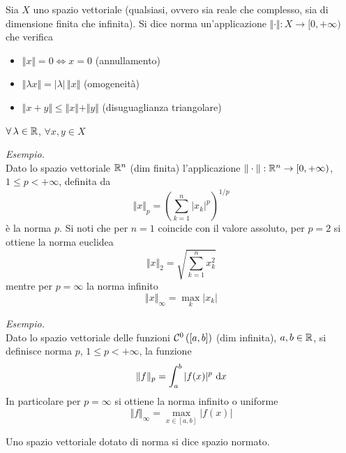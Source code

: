 \begin{defn}
[Norma]
Sia $X$ uno spazio vettoriale (qualsiasi, ovvero sia reale che complesso, sia di dimensione finita che infinita). Si dice norma un'applicazione $ \Vert \cdot \Vert : X\rightarrow [0, + \infty)$ che verifica
\begin{itemize}
\item $ \Vert x \Vert = 0\iff x = 0$ (annullamento)
\item $ \Vert \lambda x \Vert = | \lambda |\, \Vert x \Vert $ (omogeneità)
\item $ \Vert x + y \Vert \leq \Vert x \Vert + \Vert y \Vert $ (disuguaglianza triangolare)
\end{itemize}
$\forall \lambda \in \RR$, $\forall x, y\in X$
\end{defn}

\textit{Esempio.}\\
Dato lo spazio vettoriale $\mathbb{R}^n$ (dim finita) l'applicazione $ \Vert \cdot \Vert : \mathbb{R}^{n}\rightarrow [0, + \infty)$, $1 \leq p < + \infty $, definita da
\begin{equation*}
\Vert x \Vert_{p} = \left(\sum_{k=1}^n|x_k|^p\right)^{1/p}
\end{equation*}
è la norma $p$. Si noti che per $n=1$ coincide con il valore assoluto, per $p=2$ si ottiene la norma euclidea
\begin{equation*}
\Vert x \Vert_{2} = \sqrt{\sum_{k=1}^n x_k^2}
\end{equation*}
mentre per $p=\infty$ la norma infinito
\begin{equation*}
\Vert x \Vert_{\infty} = \max_k |x_k|
\end{equation*}

\textit{Esempio.}\\
Dato lo spazio vettoriale delle funzioni $\mathcal{C}^0\left([a,b]\right)$ (dim infinita), $a,b\in\mathbb{R}$, si definisce norma $p$, $1 \leq p < + \infty $, la funzione
\begin{equation*}
\Vert f \Vert_{p}=\int_a^b |f(x)|^p \  \mathrm{d} x
\end{equation*}
In particolare per $p=\infty$ si ottiene la norma infinito o uniforme
\begin{equation*}
\Vert f \Vert_{\infty}=\max_{x\in[a,b]}|f(x)|
\end{equation*}

\begin{defn}
Uno spazio vettoriale dotato di norma si dice spazio normato.
\end{defn}

